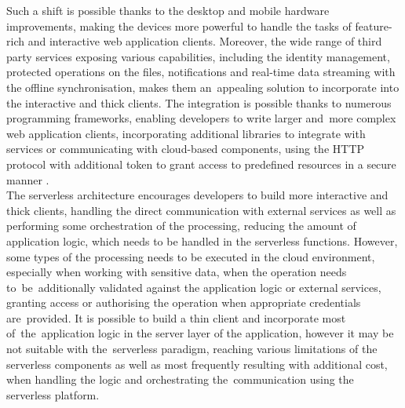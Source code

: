 Such a shift is possible thanks to the desktop and mobile hardware improvements, making the devices more powerful to handle the tasks of feature-rich and interactive web application clients.
Moreover, the wide range of third party services exposing various capabilities, including the identity management, protected operations on the files, notifications and real-time data streaming with the offline synchronisation, makes them an~appealing solution to incorporate into the interactive and thick clients.
The integration is possible thanks to numerous programming frameworks, enabling developers to write larger and~more complex web application clients, incorporating additional libraries to integrate with services or communicating with cloud-based components, using the HTTP protocol with additional token to grant access to predefined resources in a secure manner \cite{ServerlessTheFutureOfSoftwareArchitecture}. \\

The serverless architecture encourages developers to build more interactive and thick clients, handling the direct communication with external services as well as performing some orchestration of the processing, reducing the amount of application logic, which needs to be handled in the serverless functions.
However, some types of the processing needs to be executed in the cloud environment, especially when working with sensitive data, when the operation needs to~be~additionally validated against the application logic or external services, granting access or authorising the operation when appropriate credentials are~provided.
It is possible to build a thin client and incorporate most of~the~application logic in the server layer of the application, however it may be not suitable with the~serverless paradigm, reaching various limitations of the serverless components as well as most frequently resulting with additional cost, when handling the logic and orchestrating the~communication using the serverless platform. \\

